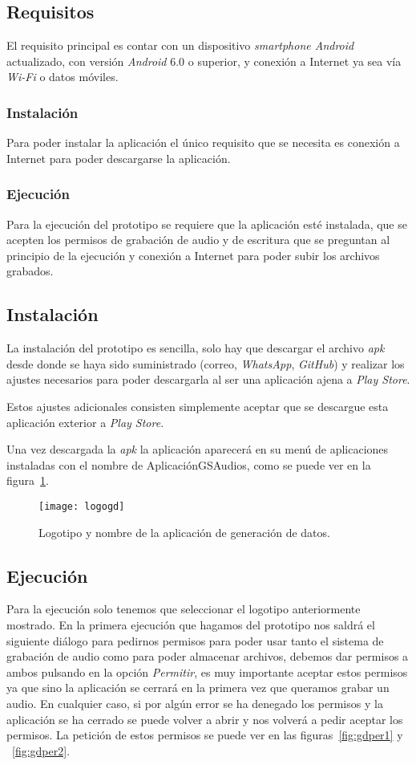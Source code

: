 \subsection{Requisitos}
El requisito principal es contar con un dispositivo \textit{smartphone Android} actualizado, con versión \textit{Android} 6.0 o superior, y conexión a Internet ya sea vía \textit{Wi-Fi} o datos móviles.

\subsubsection{Instalación}
Para poder instalar la aplicación el único requisito que se necesita es conexión a Internet para poder descargarse la aplicación.
\subsubsection{Ejecución}
Para la ejecución del prototipo se requiere que la aplicación esté instalada, que se acepten los permisos de grabación de audio y de escritura que se preguntan al principio de la ejecución y conexión a Internet para poder subir los archivos grabados.

\subsection{Instalación}
La instalación del prototipo es sencilla, solo hay que descargar el archivo \textit{apk} desde donde se haya sido suministrado (correo, \textit{WhatsApp}, \textit{GitHub}) y realizar los ajustes necesarios para poder descargarla al ser una aplicación ajena a \textit{Play Store}.

Estos ajustes adicionales consisten simplemente aceptar que se descargue esta aplicación exterior a \textit{Play Store}.

Una vez descargada la \textit{apk} la aplicación aparecerá en su menú de aplicaciones instaladas con el nombre de AplicaciónGSAudios, como se puede ver en la figura~\ref{fig:logogd}.

\begin{figure}[htb]
	\centering
	\texttt{[image: logogd]}
	\caption{Logotipo y nombre de la aplicación de generación de datos.}
	\label{fig:logogd}
\end{figure}

\subsection{Ejecución}
Para la ejecución solo tenemos que seleccionar el logotipo anteriormente mostrado. En la primera ejecución que hagamos del prototipo nos saldrá el siguiente diálogo para pedirnos permisos para poder usar tanto el sistema de grabación de audio como para poder almacenar archivos, debemos dar permisos a ambos pulsando en la opción \textit{Permitir}, es muy importante aceptar estos permisos ya que sino la aplicación se cerrará en la primera vez que queramos grabar un audio. En cualquier caso, si por algún error se ha denegado los permisos y la aplicación se ha cerrado se puede volver a abrir y nos volverá a pedir aceptar los permisos. La petición de estos permisos se puede ver en las figuras~\ref{fig:gdper1} y ~\ref{fig:gdper2}.

